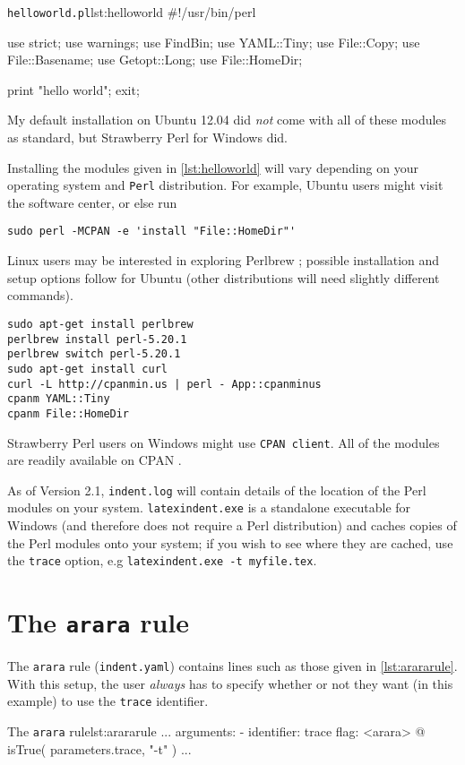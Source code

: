 \documentclass[11pt]{article}
\begin{document}
\begin{cmhlistings}[language=Perl]{\lstinline!helloworld.pl!}{lst:helloworld}
#!/usr/bin/perl

use strict;
use warnings;
use FindBin;
use YAML::Tiny;
use File::Copy;
use File::Basename;
use Getopt::Long;
use File::HomeDir;

print "hello world";
exit;
\end{cmhlistings}
My default installation on Ubuntu 12.04 did \emph{not} come
with all of these modules as standard, but Strawberry Perl for Windows \cite{strawberryperl}
did.

Installing the modules given in \cref{lst:helloworld} will vary depending on your
operating system and \lstinline!Perl! distribution. For example, Ubuntu users
might visit the software center, or else run
\begin{lstlisting}[numbers=none]
sudo perl -MCPAN -e 'install "File::HomeDir"'
\end{lstlisting}

Linux users may be interested in exploring Perlbrew \cite{perlbrew}; possible installation and setup 
options follow for Ubuntu (other distributions will need slightly different commands).
\begin{lstlisting}[numbers=none]
sudo apt-get install perlbrew
perlbrew install perl-5.20.1
perlbrew switch perl-5.20.1
sudo apt-get install curl
curl -L http://cpanmin.us | perl - App::cpanminus
cpanm YAML::Tiny
cpanm File::HomeDir
\end{lstlisting}

Strawberry Perl users on Windows might use
\lstinline!CPAN client!. All of the modules are readily available on CPAN \cite{cpan}.

As of Version 2.1,  \lstinline!indent.log! will contain details of the location
of the Perl modules on your system.  \lstinline!latexindent.exe! is a standalone
executable for Windows (and therefore does not require a Perl distribution) and caches copies of the Perl modules onto your system; if you
wish to see where they are cached, use the  \lstinline!trace! option, e.g  \lstinline!latexindent.exe -t myfile.tex!.

\section{The \lstinline!arara! rule}
The \lstinline!arara! rule (\lstinline!indent.yaml!) contains lines such as those
given in \cref{lst:arararule}. With this setup, the user \emph{always} has
to specify whether or not they want (in this example) to use the \lstinline!trace!
identifier.
\begin{cmhlistings}[style=yaml,numbers=none]{The \lstinline!arara! rule}{lst:arararule}
...
arguments:
- identifier: trace
  flag: <arara> @{ isTrue( parameters.trace, "-t" ) }
...
\end{cmhlistings}
\end{document}
